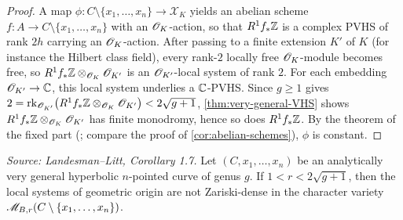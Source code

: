 \begin{proof}
  A map $\phi : C \setminus \{x_1, \ldots, x_n\} \to \mathscr{X}_K$ yields an abelian
  scheme $f : A \to C \setminus \{x_1, \ldots, x_n\}$ with an $\mathscr{O}_K$-action, so
  that $R^1 f_* \mathbb{Z}$ is a complex PVHS of rank $2h$ carrying an $\mathscr{O}_K$-action.
  After passing to a finite extension $K'$ of $K$ (for instance the Hilbert class
  field), every rank-$2$ locally free $\mathscr{O}_K$-module becomes free, so
  $R^1 f_* \mathbb{Z} \otimes_{\mathscr{O}_K} \mathscr{O}_{K'}$ is an $\mathscr{O}_{K'}$-local system of rank $2$.
  For each embedding $\mathscr{O}_{K'} \to \mathbb{C}$, this local system underlies a $\mathbb{C}$-PVHS.
  Since $g \ge 1$ gives $2 = \operatorname{rk}_{\mathscr{O}_{K'}}\bigl(R^1 f_* \mathbb{Z} \otimes_{\mathscr{O}_K}
  \mathscr{O}_{K'}\bigr) < 2\sqrt{g+1}$, \cref{thm:very-general-VHS} shows
  $R^1 f_* \mathbb{Z} \otimes_{\mathscr{O}_K} \mathscr{O}_{K'}$ has finite monodromy, hence so does
  $R^1 f_* \mathbb{Z}$. By the theorem of the fixed part
  (\cite[Corollaire 4.1.2]{deligne:hodge-ii}; compare the proof of
  \cref{cor:abelian-schemes}), $\phi$ is constant.
\end{proof}

\begin{corollary}
  \label{cor:non-density}
  \textit{Source: Landesman--Litt, Corollary 1.7.}
  Let $(C, x_1, \ldots, x_n)$ be an analytically very general hyperbolic
  $n$-pointed curve of genus $g$. If $1 < r < 2\sqrt{g+1}$, then the local
  systems of geometric origin are not Zariski-dense in the character variety
  $\mathscr{M}_{B,r}(C \setminus \{x_1, \ldots, x_n\})$.
\end{corollary}


